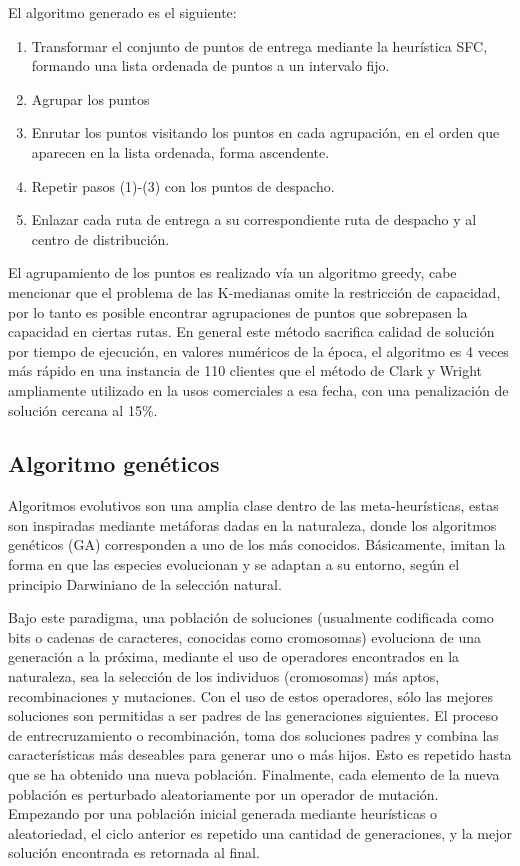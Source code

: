 \documentclass[letter, 10pt]{article}
\begin{document}
El algoritmo generado es el siguiente:

\begin{enumerate}
    \item Transformar el conjunto de puntos de entrega mediante la heurística SFC, formando una lista ordenada de puntos a un intervalo fijo.
    \item Agrupar los puntos
    \item Enrutar los puntos visitando los puntos en cada agrupación, en el orden que aparecen en la lista ordenada, forma ascendente.
    \item Repetir pasos (1)-(3) con los puntos de despacho.
    \item Enlazar cada ruta de entrega a su correspondiente ruta de despacho y al centro de distribución.
\end{enumerate}

El agrupamiento de los puntos es realizado vía un algoritmo greedy, cabe mencionar que el problema de las K-medianas omite la restricción de capacidad, por lo tanto es posible encontrar agrupaciones de puntos que sobrepasen la capacidad en ciertas rutas. En general este método sacrifica calidad de solución por tiempo de ejecución, en valores numéricos de la época, el algoritmo es 4 veces más rápido en una instancia de 110 clientes que el método de Clark y Wright \cite{clarke1964scheduling} ampliamente utilizado en la usos comerciales a esa fecha, con una penalización de solución cercana al 15\%.

\subsection{Algoritmo genéticos}
Algoritmos evolutivos son una amplia clase dentro de las meta-heurísticas, estas son inspiradas mediante metáforas dadas en la naturaleza, donde los algoritmos genéticos (GA)\cite{goldberg1989genetic} corresponden a uno de los más conocidos. Básicamente, imitan la forma en que las especies evolucionan y se adaptan a su entorno, según el principio Darwiniano de la selección natural.

Bajo este paradigma, una población de soluciones (usualmente codificada como bits o cadenas de caracteres, conocidas como cromosomas) evoluciona de una generación a la próxima, mediante el uso de operadores encontrados en la naturaleza, sea la selección de los individuos (cromosomas) más aptos, recombinaciones y mutaciones. Con el uso de estos operadores, sólo las mejores soluciones son permitidas a ser padres de las generaciones siguientes. El proceso de entrecruzamiento o recombinación, toma dos soluciones padres y combina las características más deseables para generar uno o más hijos. Esto es repetido hasta que se ha obtenido una nueva población. Finalmente, cada elemento de la nueva población es perturbado aleatoriamente por un operador de mutación. Empezando por una población inicial generada mediante heurísticas o aleatoriedad, el ciclo anterior es repetido una cantidad de generaciones, y la mejor solución encontrada es retornada al final.
\end{document}
